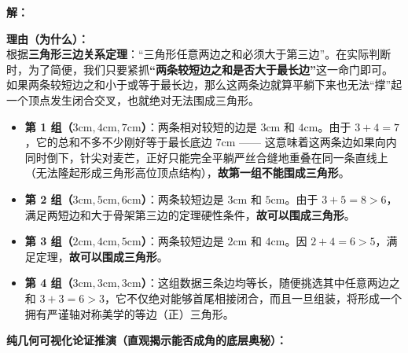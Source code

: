 \documentclass[12pt, a4paper]{ctexrep}
\begin{document}
\vspace{0.4cm}
\textbf{解：}

\textbf{理由（为什么）：} \\
根据\textbf{三角形三边关系定理}：“三角形任意两边之和必须大于第三边”。在实际判断时，为了简便，我们只要紧抓\textbf{“两条较短边之和是否大于最长边”}这一命门即可。如果两条较短边之和小于或等于最长边，那么这两条边就算平躺下来也无法“撑”起一个顶点发生闭合交叉，也就绝对无法围成三角形。
\begin{itemize}
    \item \textbf{第 1 组（$3\text{cm}, 4\text{cm}, 7\text{cm}$）}：两条相对较短的边是 $3\text{cm}$ 和 $4\text{cm}$。由于 $3 + 4 = 7$，它的总和不多不少刚好等于最长底边 $7\text{cm}$ —— 这意味着这两条边如果向内同时倒下，针尖对麦芒，正好只能完全平躺严丝合缝地重叠在同一条直线上（无法隆起形成三角形高位顶点结构），\textbf{故第一组不能围成三角形}。
    \item \textbf{第 2 组（$3\text{cm}, 5\text{cm}, 6\text{cm}$）}：两条较短边是 $3\text{cm}$ 和 $5\text{cm}$。由于 $3 + 5 = 8 > 6$，满足两短边和大于骨架第三边的定理硬性条件，\textbf{故可以围成三角形}。
    \item \textbf{第 3 组（$2\text{cm}, 4\text{cm}, 5\text{cm}$）}：两条较短边是 $2\text{cm}$ 和 $4\text{cm}$。因 $2 + 4 = 6 > 5$，满足定理，\textbf{故可以围成三角形}。
    \item \textbf{第 4 组（$3\text{cm}, 3\text{cm}, 3\text{cm}$）}：这组数据三条边均等长，随便挑选其中任意两边之和 $3 + 3 = 6 > 3$，它不仅绝对能够首尾相接闭合，而且一旦组装，将形成一个拥有严谨轴对称美学的等边（正）三角形。
\end{itemize}

\vspace{0.4cm}
\textbf{纯几何可视化论证推演（直观揭示能否成角的底层奥秘）：}
\end{document}
